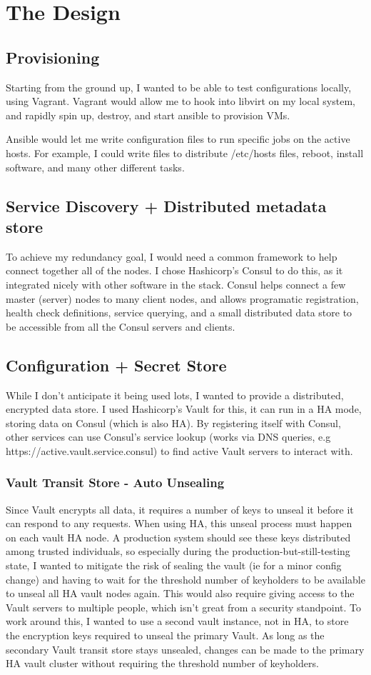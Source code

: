\documentclass{article}
\begin{document}
\section{The Design}
\subsection{Provisioning}
Starting from the ground up, I wanted to be able to test configurations locally, using Vagrant. Vagrant would allow me to hook into libvirt on my local system, and rapidly spin up, destroy, and start ansible to provision VMs.

Ansible would let me write configuration files to run specific jobs on the active hosts. For example, I could write files to distribute /etc/hosts files, reboot, install software, and many other different tasks.
\subsection{Service Discovery + Distributed metadata store}
To achieve my redundancy goal, I would need a common framework to help connect together all of the nodes. I chose Hashicorp's Consul to do this, as it integrated nicely with other software in the stack. Consul helps connect a few master (server) nodes to many client nodes, and allows programatic registration, health check definitions, service querying, and a small distributed data store to be accessible from all the Consul servers and clients. 
\subsection{Configuration + Secret Store}
While I don't anticipate it being used lots, I wanted to provide a distributed, encrypted data store. I used Hashicorp's Vault for this, it can run in a HA mode, storing data on Consul (which is also HA). By registering itself with Consul, other services can use Consul's service lookup (works via DNS queries, e.g https://active.vault.service.consul) to find active Vault servers to interact with.
\subsubsection{Vault Transit Store - Auto Unsealing}
Since Vault encrypts all data, it requires a number of keys to unseal it before it can respond to any requests. When using HA, this unseal process must happen on each vault HA node. A production system should see these keys distributed among trusted individuals, so especially during the production-but-still-testing state, I wanted to mitigate the risk of sealing the vault (ie for a minor config change) and having to wait for the threshold number of keyholders to be available to unseal all HA vault nodes again. This would also require giving access to the Vault servers to multiple people, which isn't great from a security standpoint. To work around this, I wanted to use a second vault instance, not in HA, to store the encryption keys required to unseal the primary Vault. As long as the secondary Vault transit store stays unsealed, changes can be made to the primary HA vault cluster without requiring the threshold number of keyholders.
\end{document}
